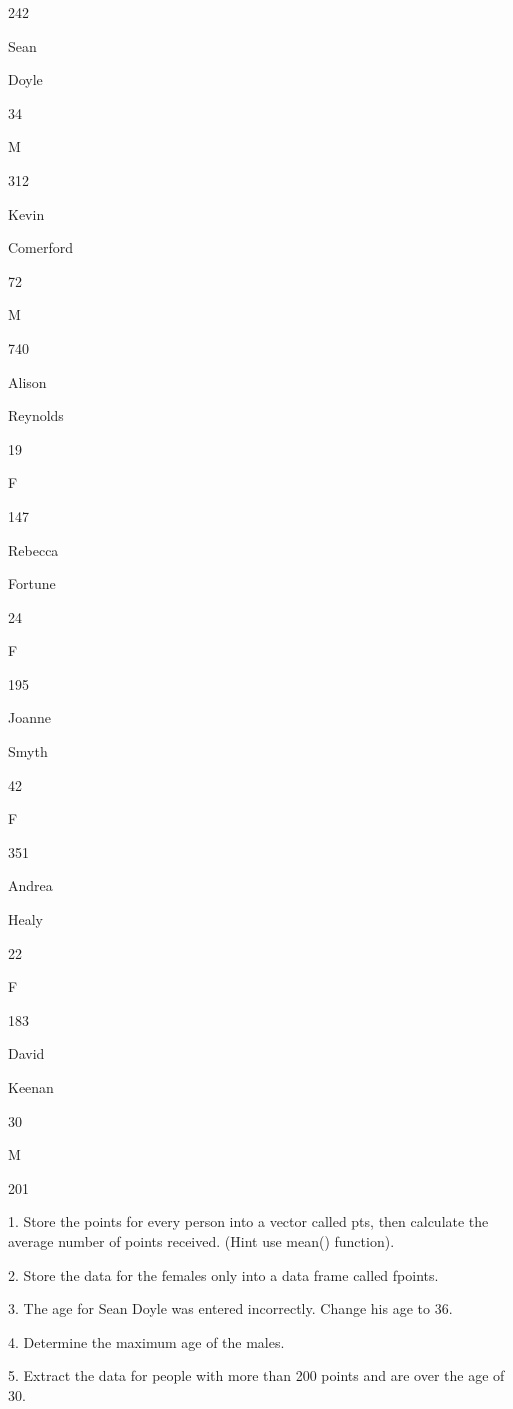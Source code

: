 242
 



Sean
 

Doyle
 

34
 

M
 

312
 



Kevin
 

Comerford
 

72
 

M
 

740
 



Alison
 

Reynolds
 

19
 

F
 

147
 



Rebecca
 

Fortune
 

24
 

F
 

195
 



Joanne
 

Smyth
 

42
 

F
 

351
 



Andrea
 

Healy
 

22
 

F
 

183
 



David
 

Keenan
 

30
 

M
 

201
 

 
1.
Store the points for every person into a vector called pts, then calculate the average number of points received. (Hint use mean() function).

2.
Store the data for the females only into a data frame called fpoints.

3.
The age for Sean Doyle was entered incorrectly. Change his age to 36.

4.
Determine the maximum age of the males.

5.
Extract the data for people with more than 200 points and are over the age of 30.


